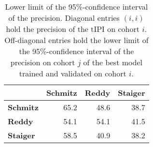 \begin{table}[ht]
    \centering
    \begin{tabular}{lrrr}
        \hline
        & \textbf{Schmitz} & \textbf{Reddy} & \textbf{Staiger} \\
        \hline
        \textbf{Schmitz} & \num{65.2} & \num{48.6} & \num{38.7} \\
        \textbf{Reddy} & \num{54.1} & \num{54.1} & \num{41.5} \\
        \textbf{Staiger} & \num{58.5} & \num{40.9} & \num{38.2} \\
        \hline
    \end{tabular}
    \caption{Lower limit of the \num{95}\%-confidence interval of the precision.
        Diagonal entries $(i, i)$ hold the precision of the $\text{tIPI}$ on cohort $i$. 
        Off-diagonal entries hold the lower limit of the \num{95}\%-confidence interval of the 
        precision on cohort $j$ of the best model trained and validated on cohort $i$.}
        \label{tab:inter-prec-ci}
\end{table}